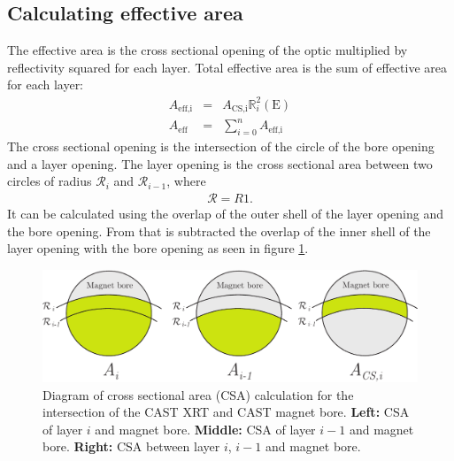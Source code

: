 \subsection{Calculating effective area}\label{sec:eff_area}
The effective area is the cross sectional opening of the optic multiplied by reflectivity squared for each layer. Total effective area is the sum of effective area for each layer:
\begin{eqnarray}
  A_{\text{eff,i}} &=& A_{\text{CS,i}}\mathbb{R}_i^2(\text{E})\\
  A_{\text{eff}} &=& \sum_{i=0}^n A_{\text{eff,i}}
\end{eqnarray}
The cross sectional opening is the intersection of the circle of the bore opening and a layer opening. The layer opening is the cross sectional area between two circles of radius $\mathcal{R}_{i}$ and $\mathcal{R}_{i-1}$, where
\begin{eqnarray}
  \mathcal{R} = \mathit{R1}.
\end{eqnarray}
It can be calculated using the overlap of the outer shell of the layer opening and the bore opening. From that is subtracted the overlap of the inner shell of the layer opening with the bore opening as seen in figure \ref{fig:cross_section_area}.

\begin{figure}[htbp]
  \centering
    \includegraphics[width=0.9\linewidth]{figures/cast/cross_section_area.pdf}
  \caption{\footnotesize Diagram of cross sectional area (CSA) calculation for the intersection of the CAST XRT and CAST magnet bore. \textbf{Left:} CSA of layer $i$ and magnet bore. \textbf{Middle:} CSA of layer $i-1$ and magnet bore. \textbf{Right:} CSA between layer $i$, $i-1$ and magnet bore.}
  \label{fig:cross_section_area}
\end{figure}

